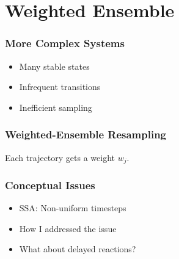 \documentclass[xcolor={usenames,dvipsnames,svgnames}]{beamer}
\begin{document}

\section{Weighted Ensemble} %
\label{sec:resampling}

\begin{frame}
    \frametitle{More Complex Systems}
    \begin{center}
        
    \end{center}

    \begin{itemize}
        \item Many stable states
        \item Infrequent transitions
        \item Inefficient sampling
    \end{itemize}
\end{frame}

\begin{frame}
    \frametitle{Weighted-Ensemble Resampling}
    Each trajectory gets a weight $w_j$.\\
    \begin{center}
        \begin{overprint}
            
            
            
            
            
        \end{overprint}
    \end{center}
\end{frame}

\begin{frame}
    \frametitle{Conceptual Issues}

    \begin{center}
        
    \end{center}

    \begin{itemize}
        \item SSA: Non-uniform timesteps
        \item How I addressed the issue
        \pause
        \item What about delayed reactions?
    \end{itemize}

\end{frame}
\end{document}
